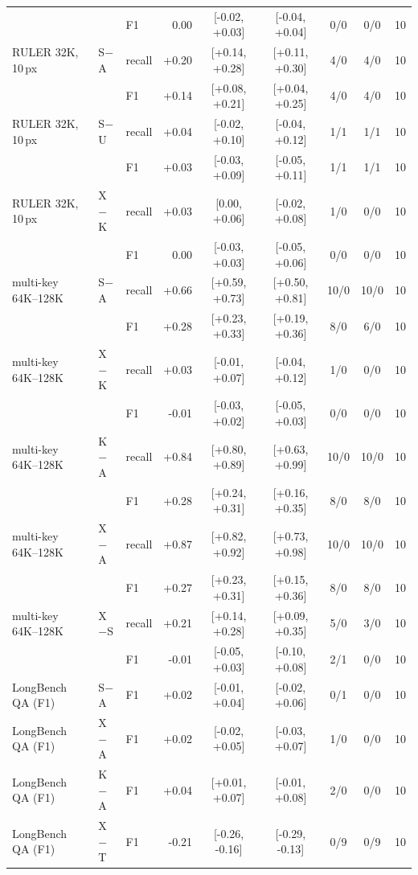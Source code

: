 \begin{table}[!htbp]
\begin{tabular}{l l l r c c c c r}
 &  & F1 & 0.00 & [-0.02, +0.03] & [-0.04, +0.04] & 0/0 & 0/0 & 10 \\
RULER 32K, 10\,px & S$-$A & recall & +0.20 & [+0.14, +0.28] & [+0.11, +0.30] & 4/0 & 4/0 & 10 \\
 &  & F1 & +0.14 & [+0.08, +0.21] & [+0.04, +0.25] & 4/0 & 4/0 & 10 \\
RULER 32K, 10\,px & S$-$U & recall & +0.04 & [-0.02, +0.10] & [-0.04, +0.12] & 1/1 & 1/1 & 10 \\
 &  & F1 & +0.03 & [-0.03, +0.09] & [-0.05, +0.11] & 1/1 & 1/1 & 10 \\
RULER 32K, 10\,px & X$-$K & recall & +0.03 & [0.00, +0.06] & [-0.02, +0.08] & 1/0 & 0/0 & 10 \\
 &  & F1 & 0.00 & [-0.03, +0.03] & [-0.05, +0.06] & 0/0 & 0/0 & 10 \\
multi-key 64K--128K & S$-$A & recall & +0.66 & [+0.59, +0.73] & [+0.50, +0.81] & 10/0 & 10/0 & 10 \\
 &  & F1 & +0.28 & [+0.23, +0.33] & [+0.19, +0.36] & 8/0 & 6/0 & 10 \\
multi-key 64K--128K & X$-$K & recall & +0.03 & [-0.01, +0.07] & [-0.04, +0.12] & 1/0 & 0/0 & 10 \\
 &  & F1 & -0.01 & [-0.03, +0.02] & [-0.05, +0.03] & 0/0 & 0/0 & 10 \\
multi-key 64K--128K & K$-$A & recall & +0.84 & [+0.80, +0.89] & [+0.63, +0.99] & 10/0 & 10/0 & 10 \\
 &  & F1 & +0.28 & [+0.24, +0.31] & [+0.16, +0.35] & 8/0 & 8/0 & 10 \\
multi-key 64K--128K & X$-$A & recall & +0.87 & [+0.82, +0.92] & [+0.73, +0.98] & 10/0 & 10/0 & 10 \\
 &  & F1 & +0.27 & [+0.23, +0.31] & [+0.15, +0.36] & 8/0 & 8/0 & 10 \\
multi-key 64K--128K & X$-$S & recall & +0.21 & [+0.14, +0.28] & [+0.09, +0.35] & 5/0 & 3/0 & 10 \\
 &  & F1 & -0.01 & [-0.05, +0.03] & [-0.10, +0.08] & 2/1 & 0/0 & 10 \\
LongBench QA (F1) & S$-$A & F1 & +0.02 & [-0.01, +0.04] & [-0.02, +0.06] & 0/1 & 0/0 & 10 \\
LongBench QA (F1) & X$-$A & F1 & +0.02 & [-0.02, +0.05] & [-0.03, +0.07] & 1/0 & 0/0 & 10 \\
LongBench QA (F1) & K$-$A & F1 & +0.04 & [+0.01, +0.07] & [-0.01, +0.08] & 2/0 & 0/0 & 10 \\
LongBench QA (F1) & X$-$T & F1 & -0.21 & [-0.26, -0.16] & [-0.29, -0.13] & 0/9 & 0/9 & 10 \\
\bottomrule
\end{tabular}
\end{table}
